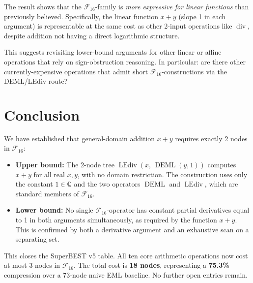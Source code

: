 \documentclass[12pt,a4paper]{article}
\theoremstyle{definition}
\newcommand{\DEML}{\operatorname{DEML}}
\newcommand{\LEdiv}{\operatorname{LEdiv}}
\newcommand{\divop}{\operatorname{div}}
\newcommand{\F}{\mathcal{F}_{16}}
\newcommand{\Q}{\mathbb{Q}}
\begin{document}
The result shows that the $\F$-family is \emph{more expressive for linear
functions} than previously believed.
Specifically, the linear function $x + y$ (slope 1 in each argument) is
representable at the same cost as other 2-input operations like $\divop$,
despite addition not having a direct logarithmic structure.

This suggests revisiting lower-bound arguments for other linear or affine
operations that rely on sign-obstruction reasoning.
In particular: are there other currently-expensive operations that admit
short $\F$-constructions via the DEML/LEdiv route?

\section{Conclusion}
\label{sec:conclusion}

We have established that general-domain addition $x + y$ requires exactly
2 nodes in $\mathcal{F}_{16}$:
\begin{itemize}
  \item \textbf{Upper bound:} The 2-node tree $\LEdiv(x,\,\DEML(y,1))$
    computes $x+y$ for all real $x, y$, with no domain restriction.
    The construction uses only the constant $1 \in \Q$ and the two operators
    $\DEML$ and $\LEdiv$, which are standard members of $\F$.
  \item \textbf{Lower bound:} No single $\F$-operator has constant partial
    derivatives equal to 1 in both arguments simultaneously, as required
    by the function $x+y$.
    This is confirmed by both a derivative argument and an exhaustive scan
    on a separating set.
\end{itemize}

This closes the SuperBEST v5 table.
All ten core arithmetic operations now cost at most 3 nodes in $\F$.
The total cost is \textbf{18 nodes}, representing a \textbf{75.3\%} compression
over a 73-node naive EML baseline.
No further open entries remain.
\end{document}
